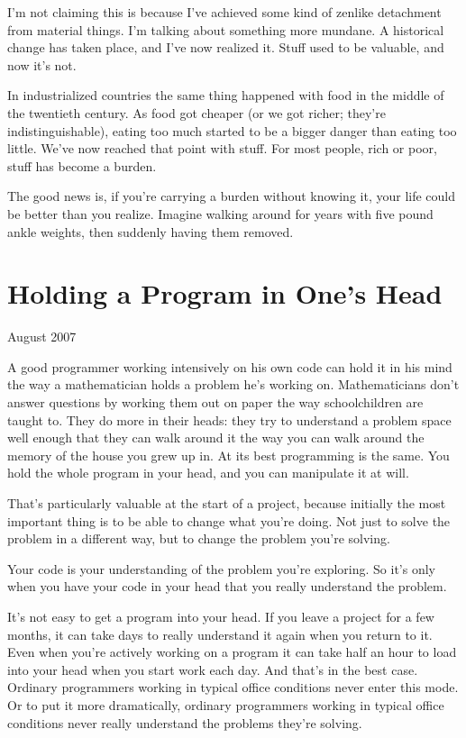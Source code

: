 \documentclass[12pt]{book}
\begin{document}
I'm not claiming this is because I've achieved some kind of zenlike
detachment from material things. I'm talking about something more
mundane. A historical change has taken place, and I've now realized it.
Stuff used to be valuable, and now it's not.

In industrialized countries the same thing happened with food in the
middle of the twentieth century. As food got cheaper (or we got richer;
they're indistinguishable), eating too much started to be a bigger
danger than eating too little. We've now reached that point with stuff.
For most people, rich or poor, stuff has become a burden.

The good news is, if you're carrying a burden without knowing it, your
life could be better than you realize. Imagine walking around for years
with five pound ankle weights, then suddenly having them removed.
\chapter{Holding a Program in One's Head}

August 2007

A good programmer working intensively on his own code can hold it in his
mind the way a mathematician holds a problem he's working on.
Mathematicians don't answer questions by working them out on paper the
way schoolchildren are taught to. They do more in their heads: they try
to understand a problem space well enough that they can walk around it
the way you can walk around the memory of the house you grew up in. At
its best programming is the same. You hold the whole program in your
head, and you can manipulate it at will.

That's particularly valuable at the start of a project, because
initially the most important thing is to be able to change what you're
doing. Not just to solve the problem in a different way, but to change
the problem you're solving.

Your code is your understanding of the problem you're exploring. So it's
only when you have your code in your head that you really understand the
problem.

It's not easy to get a program into your head. If you leave a project
for a few months, it can take days to really understand it again when
you return to it. Even when you're actively working on a program it can
take half an hour to load into your head when you start work each day.
And that's in the best case. Ordinary programmers working in typical
office conditions never enter this mode. Or to put it more dramatically,
ordinary programmers working in typical office conditions never really
understand the problems they're solving.
\end{document}
